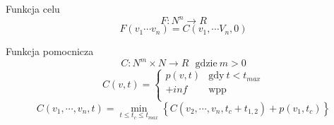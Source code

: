 \begin{frame}

	\begin{block}{Funkcja celu}
		\begin{equation}
			F : N^n \rightarrow R
		\end{equation}
		\begin{equation}
			F(v_1 \cdots v_n) = C(v_1, \cdots V_n, 0)
		\end{equation}
	\end{block}

	\begin{block}{Funkcja pomocnicza}
		\begin{equation}
			C : N^m \times N \rightarrow R \ \ \ \text{gdzie} \ m > 0
		\end{equation}
		\begin{equation}
			C(v, t) = \begin{cases}
				p(v, t)	&	\text{gdy} \ t < t_{max} 	\\
				+inf	&	\text{wpp}			\\
			\end{cases}
		\end{equation}
		\begin{equation}
			C(v_1, \cdots, v_n, t) = \min\limits_{t \leq t_c \le t_{max}}\left\{ C(v_2, \cdots, v_n, t_c + t_{1,2}) + p(v_1, t_c) \right\}
		\end{equation}
	\end{block}

\end{frame}
